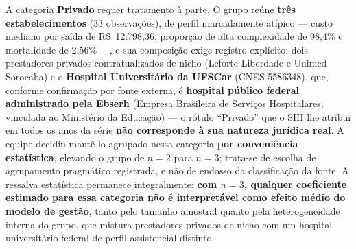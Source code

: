 A categoria \textbf{Privado} requer tratamento à parte. O grupo reúne \textbf{três estabelecimentos} (33 observações), de perfil marcadamente atípico --- custo mediano por saída de R\$~12.798,36, proporção de alta complexidade de 98,4\% e mortalidade de 2,56\% ---, e sua composição exige registro explícito: dois prestadores privados contratualizados de nicho (Leforte Liberdade e Unimed Sorocaba) e o \textbf{Hospital Universitário da UFSCar} (CNES 5586348), que, conforme confirmação por fonte externa, é \textbf{hospital público federal administrado pela Ebserh} (Empresa Brasileira de Serviços Hospitalares, vinculada ao Ministério da Educação) --- o rótulo ``Privado'' que o SIH lhe atribui em todos os anos da série \textbf{não corresponde à sua natureza jurídica real}. A equipe decidiu mantê-lo agrupado nessa categoria \textbf{por conveniência estatística}, elevando o grupo de $n=2$ para $n=3$; trata-se de escolha de agrupamento pragmático registrada, e não de endosso da classificação da fonte. A ressalva estatística permanece integralmente: \textbf{com $n=3$, qualquer coeficiente estimado para essa categoria não é interpretável como efeito médio do modelo de gestão}, tanto pelo tamanho amostral quanto pela heterogeneidade interna do grupo, que mistura prestadores privados de nicho com um hospital universitário federal de perfil assistencial distinto.

